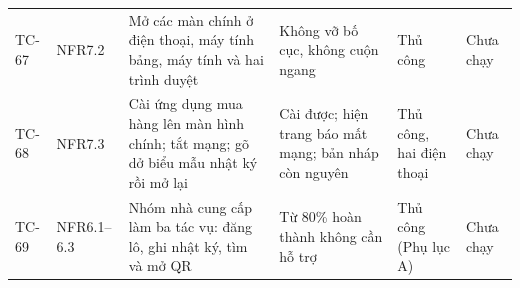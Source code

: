 \begin{longtable}{L{1.40cm} L{1.55cm} L{4.00cm} L{4.05cm} L{1.95cm} L{1.95cm}}
TC-67 & NFR7.2 & Mở các màn chính ở điện thoại, máy tính bảng, máy tính và hai trình duyệt & Không vỡ bố cục, không cuộn ngang & Thủ công & Chưa chạy \\
TC-68 & NFR7.3 & Cài ứng dụng mua hàng lên màn hình chính; tắt mạng; gõ dở biểu mẫu nhật ký rồi mở lại & Cài được; hiện trang báo mất mạng; bản nháp còn nguyên & Thủ công, hai điện thoại & Chưa chạy \\
TC-69 & NFR6.1--6.3 & Nhóm nhà cung cấp làm ba tác vụ: đăng lô, ghi nhật ký, tìm và mở QR & Từ 80\% hoàn thành không cần hỗ trợ & Thủ công (Phụ lục A) & Chưa chạy \\
\end{longtable}
\endgroup
